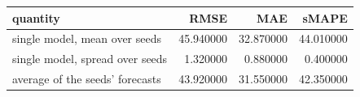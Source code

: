 \begin{tabular}{lrrr}
\toprule
quantity & RMSE & MAE & sMAPE \\
\midrule
single model, mean over seeds & 45.940000 & 32.870000 & 44.010000 \\
single model, spread over seeds & 1.320000 & 0.880000 & 0.400000 \\
average of the seeds' forecasts & 43.920000 & 31.550000 & 42.350000 \\
\bottomrule
\end{tabular}
